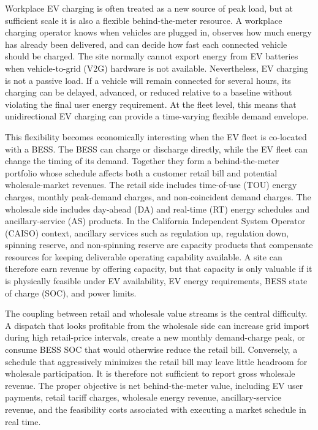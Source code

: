 \documentclass[final,5p,times]{elsarticle}
\begin{document}
Workplace EV charging is often treated as a new source of peak load, but at sufficient scale it is also a flexible behind-the-meter resource. A workplace charging operator knows when vehicles are plugged in, observes how much energy has already been delivered, and can decide how fast each connected vehicle should be charged. The site normally cannot export energy from EV batteries when vehicle-to-grid (V2G) hardware is not available. Nevertheless, EV charging is not a passive load. If a vehicle will remain connected for several hours, its charging can be delayed, advanced, or reduced relative to a baseline without violating the final user energy requirement. At the fleet level, this means that unidirectional EV charging can provide a time-varying flexible demand envelope.

This flexibility becomes economically interesting when the EV fleet is co-located with a BESS. The BESS can charge or discharge directly, while the EV fleet can change the timing of its demand. Together they form a behind-the-meter portfolio whose schedule affects both a customer retail bill and potential wholesale-market revenues. The retail side includes time-of-use (TOU) energy charges, monthly peak-demand charges, and non-coincident demand charges. The wholesale side includes day-ahead (DA) and real-time (RT) energy schedules and ancillary-service (AS) products. In the California Independent System Operator (CAISO) context, ancillary services such as regulation up, regulation down, spinning reserve, and non-spinning reserve are capacity products that compensate resources for keeping deliverable operating capability available. A site can therefore earn revenue by offering capacity, but that capacity is only valuable if it is physically feasible under EV availability, EV energy requirements, BESS state of charge (SOC), and power limits.

The coupling between retail and wholesale value streams is the central difficulty. A dispatch that looks profitable from the wholesale side can increase grid import during high retail-price intervals, create a new monthly demand-charge peak, or consume BESS SOC that would otherwise reduce the retail bill. Conversely, a schedule that aggressively minimizes the retail bill may leave little headroom for wholesale participation. It is therefore not sufficient to report gross wholesale revenue. The proper objective is net behind-the-meter value, including EV user payments, retail tariff charges, wholesale energy revenue, ancillary-service revenue, and the feasibility costs associated with executing a market schedule in real time.
\end{document}
